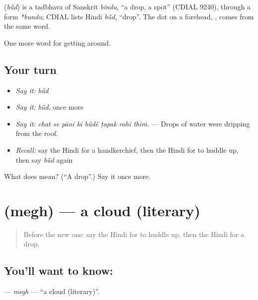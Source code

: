 \begin{cousinweb}
\textbf{} (\emph{bū̃d}) is a tadbhava of Sanskrit \emph{bindu}, \textquotedblleft{}a drop, a spot\textquotedblright{} (CDIAL 9240), through a form \emph{*bundu}; CDIAL lists Hindi \emph{bū̃d}, \textquotedblleft{}drop\textquotedblright{}. The dot on a forehead, , comes from the same word.
\end{cousinweb}

\begin{grammarlens}[title={What you've built}]
One more word for getting around.
\end{grammarlens}

\subsection*{Your turn}
\begin{itemize}
\raggedright
  \item \emph{Say it:} \emph{bū̃d}
  \item \emph{Say it:} \emph{bū̃d}, once more
  \item \emph{Say it:} \emph{chat se pānī kī bū̃dẽ ṭapak rahī thīṁ.} — Drops of water were dripping from the roof.
  \item \emph{Recall:} say the Hindi for a handkerchief, then the Hindi for to huddle up, then say \emph{bū̃d} again
\end{itemize}

\begin{tcolorbox}[breakable,colback=teal!4,colframe=teal!35!black,title={Before you move on}]
What does  mean? (\textquotedblleft{}A drop\textquotedblright{}.) Say it once more.
\end{tcolorbox}
\section[\texorpdfstring{\hi{मेघ} (megh)}{मेघ (megh)}]{ (megh) — a cloud (literary)}

\label{lesson:HI-C436-megh}



\begin{quote}
Before the new one: say the Hindi for to huddle up, then the Hindi for a drop.
\end{quote}

\subsection*{You'll want to know: }
\textbf{} — \emph{megh} — \textquotedblleft{}a cloud (literary)\textquotedblright{}.

